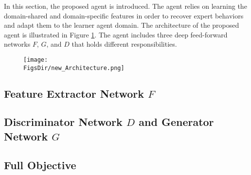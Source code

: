 In this section,
the proposed \DAIL{} agent is introduced.
The agent relies on learning the domain-shared and domain-specific features in order to recover expert behaviors and adapt them to the learner agent domain.
The architecture of the proposed agent is illustrated in Figure \ref{ch:DAIL:fig:Architecture}.
The agent includes three deep feed-forward networks $F$, $G$, and $D$ that holds different responsibilities.

\begin{figure}[htbp!]
  \centering
  \texttt{[image: \\FigsDir/new\_Architecture.png]}
  \caption{}
  \label{ch:DAIL:fig:Architecture}
\end{figure}

\subsection{Feature Extractor Network \texorpdfstring{$F$}{F}}


\subsection{Discriminator Network \texorpdfstring{$D$}{D} and Generator Network \texorpdfstring{$G$}{G}}


\subsection{Full Objective}

